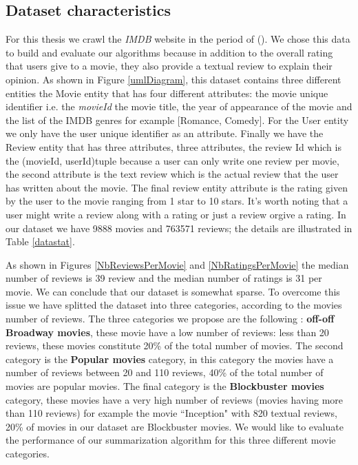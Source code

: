 \documentclass{article}
\begin{document}
\subsection{Dataset characteristics}
For this thesis we crawl the \textit{IMDB} website in the period of (). We chose this data to build and evaluate our algorithms because in addition to the overall rating that users give to a movie, they also provide a textual review to explain their opinion. As shown in Figure \ref{umlDiagram}, this dataset contains three different entities the Movie entity that has four different attributes: the movie unique identifier i.e. the \textit{movieId} the movie title, the year of appearance of the movie  and the list of the IMDB genres for example [Romance, Comedy]. For the User entity we only have the user unique identifier as an attribute. Finally we have the Review entity that has three attributes, three attributes, the review Id which is the (movieId, userId)tuple because a user can only write one review per movie, the second attribute is the text review which is the actual review that the user has written about the movie. The final review entity attribute is the rating given by the user to the movie ranging from 1 star to 10 stars. It's worth noting that a user might write a review along with a rating or just a review orgive a rating. In our dataset we have 9888 movies  and 763571 reviews; the details are illustrated in Table \ref{datastat}.

As shown in Figures \ref{NbReviewsPerMovie} and \ref{NbRatingsPerMovie} the median number of reviews is 39 review and the median number of ratings is 31 per movie. We can conclude that our dataset is somewhat sparse.
To overcome this issue we have splitted the dataset into three categories, according to the movies number of reviews. The three categories we propose are the following : \textbf{off-off Broadway movies}, these movie have a low number of reviews: less than 20 reviews, these movies constitute 20\% of the total number of movies. The second category is the \textbf{Popular movies} category, in this category the movies have a number of reviews between 20 and 110 reviews, 40\% of the total number of movies are popular movies. The final category is the \textbf{Blockbuster movies} category, these movies have a very high number of reviews (movies having more than 110 reviews) for example the movie ``Inception" with 820 textual reviews,  20\% of movies in our dataset are Blockbuster movies.
We would like to evaluate the performance of our summarization algorithm for this three different movie categories.
\end{document}
